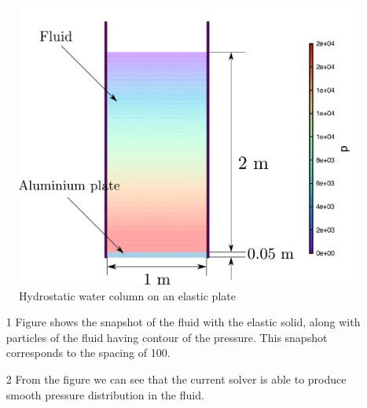 \documentclass[10pt, conference]{FMFP2022}
\begin{document}
\begin{figure}[H]
  \centering
  \includegraphics[scale=0.4]{images/ng_2020_hydrostatic_water_column_on_elastic_plate/schematic}
  \caption{Hydrostatic water column on an elastic plate}
\label{fig:hs-water-on-plate}
\end{figure}

%


\begin{itemize}
\item [1] Figure shows the snapshot of the fluid with the elastic solid, along
  with particles of the fluid having contour of the pressure. This snapshot
  corresponds to the spacing of 100.
\item [2] From the figure we can see that the current solver is able to produce
  smooth pressure distribution in the fluid.
\end{itemize}
\end{document}
